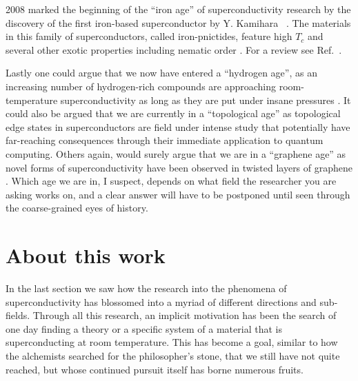 2008 marked the beginning of the ``iron age'' of superconductivity research by the discovery of the first iron-based superconductor  by
Y. Kamihara \etal\ \cite{Kamihara08}. The materials in this family of superconductors, called iron-pnictides, feature high $T_c$ and several other exotic
properties including nematic order \cite{Fernandes14}. For a review see Ref.~\cite{Paglione10}.

Lastly one could argue that we now have entered a ``hydrogen age'', as an increasing number of hydrogen-rich compounds are approaching room-temperature
superconductivity as long as they are put under insane pressures \cite{Semenok20, Snider20}. It could also be argued that we are currently in a
``topological age'' as topological edge states in superconductors are field under intense study \cite{Wang20} that potentially have far-reaching
consequences through their immediate application to quantum computing. Others again, would surely argue that we are in a ``graphene age'' as 
novel forms of superconductivity have been observed in twisted layers of graphene \cite{Park21}.
Which age we are in, I suspect, depends on what field the researcher
you are asking works on, and a clear answer will have to be postponed until seen through the coarse-grained eyes of history.


\section{About this work}

In the last section we saw how the research into the phenomena of superconductivity has blossomed into a myriad of different directions and sub-fields. Through
all this research, an implicit motivation has been the search of one day finding a theory or a specific system of a material that is superconducting at
room temperature. This has become a goal, similar to how the alchemists searched for the philosopher's stone, that we still have not quite reached,
but whose continued pursuit itself has borne numerous fruits. 

